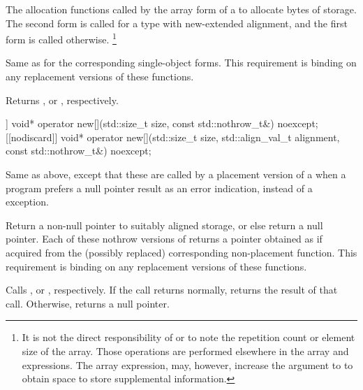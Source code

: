 \begin{itemdescr}
\pnum
\effects
The
allocation functions
called by the array form of a
to allocate
 bytes of storage.
The second form is called for a type with new-extended alignment, and
the first form is called otherwise.%
\footnote{It is not the direct responsibility of
or
to note the repetition count or element size of the array.
Those operations are performed elsewhere in the array
and
expressions.
The array
expression, may, however, increase the  argument to
to obtain space to store supplemental information.}

\pnum
\replaceable
{}

\pnum
\required
Same as for
the corresponding single-object forms.
This requirement is binding on any replacement versions of these functions.

\pnum
{}
Returns
,
or
,
respectively.
\end{itemdescr}

%
\begin{itemdecl}
[[nodiscard]] void* operator new[](std::size_t size, const std::nothrow_t&) noexcept;
[[nodiscard]] void* operator new[](std::size_t size, std::align_val_t alignment,
                                   const std::nothrow_t&) noexcept;
\end{itemdecl}

\begin{itemdescr}
\pnum
\effects
Same as above, except that these are called by a placement version of a
when a \Cpp{} program prefers a null pointer result as an error indication,
instead of a
exception.

\pnum
\replaceable
{}

\pnum
\required
Return a non-null pointer to suitably aligned storage,
or else return a null pointer.
Each of these nothrow versions of
returns a pointer obtained as if
acquired from the (possibly replaced)
corresponding non-placement function.
This requirement is binding on any replacement versions of these functions.

\pnum
{}
Calls ,
or ,
respectively.
If the call returns normally,
returns the result of that call.
Otherwise, returns a null pointer.
\end{itemdescr}

